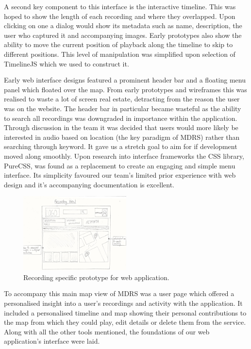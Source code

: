 \documentclass{l3proj}
\begin{document}
A second key component to this interface is the interactive timeline. This was hoped to show the length of each recording and where they overlapped. Upon clicking on one a dialog would show its metadata such as name, description, the user who captured it and accompanying images. Early prototypes also show the ability to move the current position of playback along the timeline to skip to different positions. This level of manipulation was simplified upon selection of TimelineJS which we used to construct it.

Early web interface designs featured a prominent header bar and a floating menu panel which floated over the map. From early prototypes and wireframes this was realised to waste a lot of screen real estate, detracting from the reason the user was on the website. The header bar in particular became wasteful as the ability to search all recordings was downgraded in importance within the application. Through discussion in the team it was decided that users would more likely be interested in audio based on location (the key paradigm of MDRS) rather than searching through keyword. It gave us a stretch goal to aim for if development moved along smoothly. Upon research into interface frameworks the CSS library, PureCSS, was found as a replacement to create an engaging and simple menu interface. Its simplicity favoured our team’s limited prior experience with web design and it’s accompanying documentation is excellent.

\begin{figure}[ht!]
  \centering
\includegraphics[width=0.5\textwidth]{images/web-recording-view.jpg}
\caption{Recording specific prototype for web application.}
\end{figure}

To accompany this main map view of MDRS was a user page which offered a
personalised insight into a user’s recordings and activity with the application.
It included a personalised timeline and map showing their personal contributions
to the map from which they could play, edit details or delete them from the
service. Along with all the other tools mentioned, the foundations of our
web application’s interface were laid.
\end{document}
